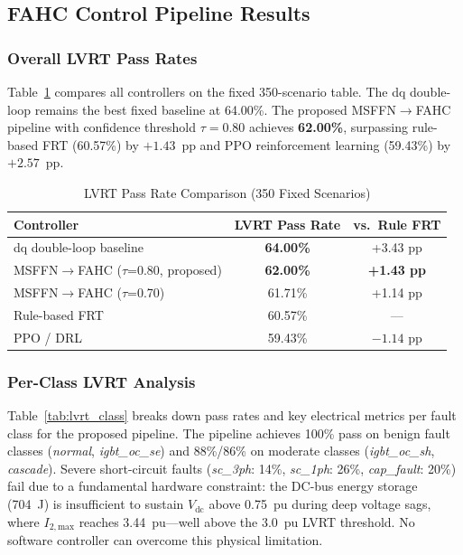 \subsection{FAHC Control Pipeline Results}
\label{sec:control-results}

\subsubsection{Overall LVRT Pass Rates}

Table~\ref{tab:control} compares all controllers on the
fixed 350-scenario table.
The dq double-loop remains the best fixed baseline at 64.00\%.
The proposed MSFFN$\rightarrow$FAHC pipeline with confidence
threshold $\tau{=}0.80$ achieves \textbf{62.00\%}, surpassing
rule-based FRT (60.57\%) by $+1.43$~pp
and PPO reinforcement learning (59.43\%) by $+2.57$~pp.

\begin{table}[htbp]
\caption{LVRT Pass Rate Comparison (350 Fixed Scenarios)}
\label{tab:control}
\centering
\begin{tabular}{lcc}
\hline
Controller & LVRT Pass Rate & vs.\ Rule FRT \\
\hline
dq double-loop baseline         & \textbf{64.00\%} & +3.43 pp \\
MSFFN$\rightarrow$FAHC ($\tau$=0.80, proposed) & \textbf{62.00\%} & \textbf{+1.43 pp} \\
MSFFN$\rightarrow$FAHC ($\tau$=0.70)            & 61.71\% & +1.14 pp \\
Rule-based FRT                  & 60.57\% & — \\
PPO / DRL                       & 59.43\% & $-1.14$ pp \\
\hline
\end{tabular}
\end{table}

\subsubsection{Per-Class LVRT Analysis}

Table~\ref{tab:lvrt_class} breaks down pass rates and
key electrical metrics per fault class for the proposed pipeline.
The pipeline achieves 100\% pass on benign fault classes
(\textit{normal}, \textit{igbt\_oc\_se}) and 88\%/86\%
on moderate classes (\textit{igbt\_oc\_sh}, \textit{cascade}).
Severe short-circuit faults (\textit{sc\_3ph}: 14\%,
\textit{sc\_1ph}: 26\%, \textit{cap\_fault}: 20\%)
fail due to a fundamental hardware constraint:
the DC-bus energy storage (704~J) is insufficient to
sustain $V_\text{dc}$ above 0.75~pu during deep voltage sags,
where $I_{2,\text{max}}$ reaches 3.44~pu—well above the
3.0~pu LVRT threshold.
No software controller can overcome this physical limitation.

